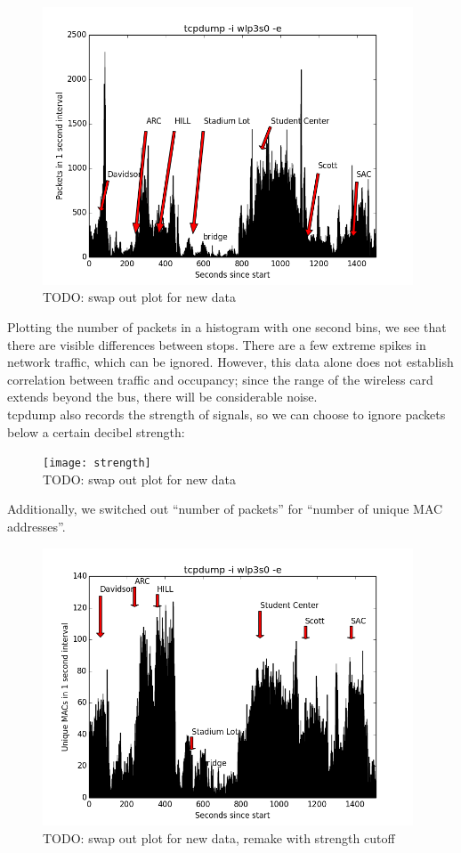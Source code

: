 \documentclass[letterpaper]{scrartcl}
\begin{document}
	\begin{figure}[H]
	\includegraphics[width=11cm]{packets}
	\\TODO: swap out plot for new data
	\centering
	\end{figure}

	Plotting the number of packets in a histogram with one second bins, we see that there are visible differences between stops.
	There are a few extreme spikes in network traffic, which can be ignored.
	However, this data alone does not establish correlation between traffic and occupancy; since the range of the wireless card extends beyond the bus, there will be considerable noise.
	\\
	tcpdump also records the strength of signals, so we can choose to ignore packets below a certain decibel strength:

	\begin{figure}[H]
	\texttt{[image: strength]}
	\\TODO: swap out plot for new data
	\centering
	\end{figure}

	Additionally, we switched out ``number of packets'' for ``number of unique MAC addresses''.

	\begin{figure}[H]
	\includegraphics[width=11cm]{unique}
	\\TODO: swap out plot for new data, remake with strength cutoff
	\centering
	\end{figure}
\end{document}
